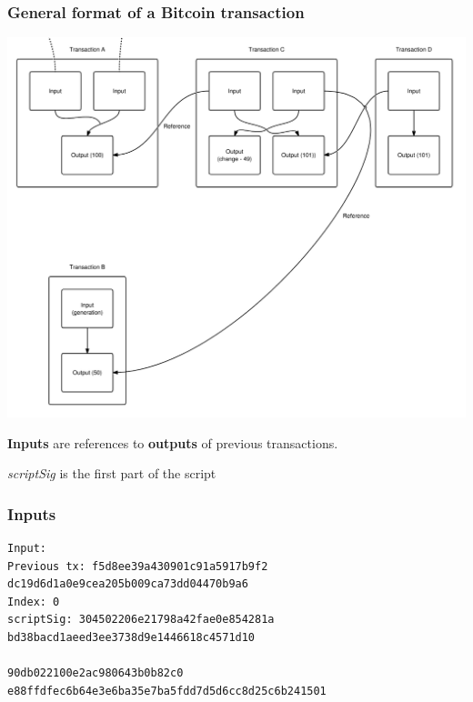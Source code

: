 \documentclass{beamer}
\begin{document}
\begin{frame}
\frametitle{General format of a Bitcoin transaction}
\includegraphics[scale=0.2]{images/transactions.png}
\end{frame}

\begin{frame}[fragile]
\textbf{Inputs} are references to \textbf{outputs} of previous transactions.

\textit{scriptSig} is the first part of the script
\frametitle{Inputs}
\begin{verbatim}Input:
Previous tx: f5d8ee39a430901c91a5917b9f2
dc19d6d1a0e9cea205b009ca73dd04470b9a6
Index: 0
scriptSig: 304502206e21798a42fae0e854281a
bd38bacd1aeed3ee3738d9e1446618c4571d10

90db022100e2ac980643b0b82c0
e88ffdfec6b64e3e6ba35e7ba5fdd7d5d6cc8d25c6b241501
\end{verbatim}
\end{frame}
\end{document}
